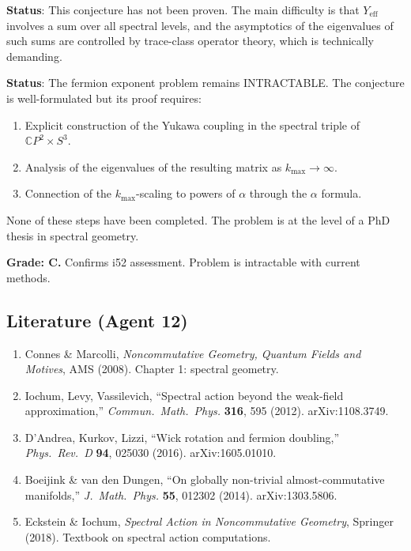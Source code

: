 \documentclass[11pt,a4paper]{article}
\newcommand{\CP}{\mathbb{C}P}
\begin{document}
\textbf{Status}: This conjecture has not been proven. The main difficulty is that $Y_{\mathrm{eff}}$ involves a sum over all spectral levels, and the asymptotics of the eigenvalues of such sums are controlled by trace-class operator theory, which is technically demanding.

\begin{tcolorbox}[colback=red!5!white, colframe=red!60!black, title={Agent 12: Fermion Exponents}]
\textbf{Status}: The fermion exponent problem remains INTRACTABLE. The conjecture is well-formulated but its proof requires:
\begin{enumerate}
\item Explicit construction of the Yukawa coupling in the spectral triple of $\CP^2 \times S^3$.
\item Analysis of the eigenvalues of the resulting matrix as $k_{\max} \to \infty$.
\item Connection of the $k_{\max}$-scaling to powers of $\alpha$ through the $\alpha$ formula.
\end{enumerate}

None of these steps have been completed. The problem is at the level of a PhD thesis in spectral geometry.

\textbf{Grade: C.} Confirms i52 assessment. Problem is intractable with current methods.
\end{tcolorbox}

\subsection{Literature (Agent 12)}

\begin{enumerate}
\item Connes \& Marcolli, \textit{Noncommutative Geometry, Quantum Fields and Motives}, AMS (2008). Chapter 1: spectral geometry.
\item Iochum, Levy, Vassilevich, ``Spectral action beyond the weak-field approximation,'' \textit{Commun.\ Math.\ Phys.} \textbf{316}, 595 (2012). arXiv:1108.3749.
\item D'Andrea, Kurkov, Lizzi, ``Wick rotation and fermion doubling,'' \textit{Phys.\ Rev.\ D} \textbf{94}, 025030 (2016). arXiv:1605.01010.
\item Boeijink \& van den Dungen, ``On globally non-trivial almost-commutative manifolds,'' \textit{J.\ Math.\ Phys.} \textbf{55}, 012302 (2014). arXiv:1303.5806.
\item Eckstein \& Iochum, \textit{Spectral Action in Noncommutative Geometry}, Springer (2018). Textbook on spectral action computations.
\end{enumerate}
\end{document}
